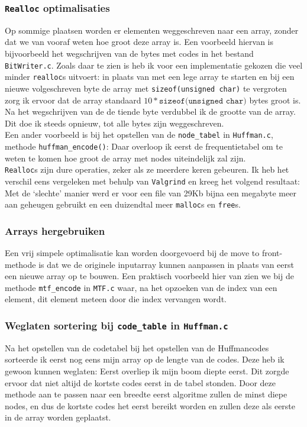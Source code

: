 \documentclass[11pt,a4paper]{article}
\begin{document}
\subsubsection*{\texttt{Realloc} optimalisaties}
Op sommige plaatsen worden er elementen weggeschreven naar een array, zonder dat we van vooraf weten hoe groot deze array is. Een voorbeeld hiervan is bijvoorbeeld het wegschrijven van de bytes met codes in het bestand \texttt{BitWriter.c}. Zoals daar te zien is heb ik voor een implementatie gekozen die veel minder \texttt{realloc}s uitvoert: in plaats van met een lege array te starten en bij een nieuwe volgeschreven byte de array met \texttt{sizeof(unsigned char)} te vergroten zorg ik ervoor dat de array standaard $10*\texttt{sizeof(unsigned char)}$ bytes groot is. Na het wegschrijven van de de tiende byte verdubbel ik de grootte van de array. Dit doe ik steeds opnieuw, tot alle bytes zijn weggeschreven.\\
Een ander voorbeeld is bij het opstellen van de \texttt{node\_tabel} in \texttt{Huffman.c}, methode \texttt{huffman\_encode()}: Daar overloop ik eerst de frequentietabel om te weten te komen hoe groot de array met nodes uiteindelijk zal zijn.\\
\texttt{Realloc}s zijn dure operaties, zeker als ze meerdere keren gebeuren. Ik heb het verschil eens vergeleken met behulp van \texttt{Valgrind} en kreeg het volgend resultaat: Met de `slechte' manier werd er voor een file van 29Kb bijna een megabyte meer aan geheugen gebruikt en een duizendtal meer \texttt{malloc}s en \texttt{free}s.

\subsubsection*{Arrays hergebruiken}
Een vrij simpele optimalisatie kan worden doorgevoerd bij de move to front-methode is dat we de originele inputarray kunnen aanpassen in plaats van eerst een nieuwe array op te bouwen. Een praktisch voorbeeld hier van zien we bij de methode \texttt{mtf\_encode} in \texttt{MTF.c} waar, na het opzoeken van de index van een element, dit element meteen door die index vervangen wordt.

\subsubsection*{Weglaten sortering bij \texttt{code\_table} in \texttt{Huffman.c}}
Na het opstellen van de codetabel bij het opstellen van de Huffmancodes sorteerde ik eerst nog eens mijn array op de lengte van de codes. Deze heb ik gewoon kunnen weglaten: Eerst overliep ik mijn boom diepte eerst. Dit zorgde ervoor dat niet altijd de kortste codes eerst in de tabel stonden. Door deze methode aan te passen naar een breedte eerst algoritme zullen de minst diepe nodes, en dus de kortste codes het eerst bereikt worden en zullen deze als eerste in de array worden geplaatst.
\end{document}
